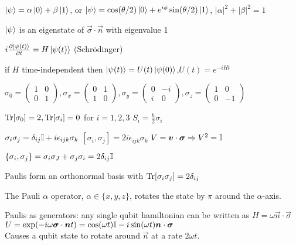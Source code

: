
\begin{squishlist}
    \item $\ket{\psi} = \alpha \ket{0} + \beta \ket{1}$, or $\ket{\psi} = \cos(\theta/2)\ket{0} + e^{i\phi} \sin(\theta/2)\ket{1}$, $|\alpha|^2 + |\beta|^2 = 1$
    \item $\ket{\psi}$ is an eigenstate of $\vec{\sigma}\cdot \vec{n}$ with eigenvalue 1
\end{squishlist}

\begin{squishlist}
    \item $i \D{t}{\ket{\psi(t)}} = H \ket{\psi(t)}$ (Schrödinger)
    \item if $H$ time-independent then $\ket{\psi(t)} = U(t) \ket{\psi(0)}$,\quad $U(t) = e^{-iHt}$
\end{squishlist}

\begin{squishlist}
    \item $\sigma_0 = \begin{pmatrix} 1 & 0\\ 0 & 1 \end{pmatrix},
        \sigma_x = \begin{pmatrix} 0 & 1 \\ 1 & 0 \end{pmatrix}, 
        \sigma_y=\begin{pmatrix} 0 & -i\\ i & 0\end{pmatrix} , 
        \sigma_z = \begin{pmatrix} 1 & 0 \\ 0 & -1\end{pmatrix}$

    \item $\Tr[\sigma_0] = 2, \Tr[\sigma_i] = 0$ for $i=1,2,3$ \hfill $S_i = \frac{\hbar}{2} \sigma_i$
    \item $\sigma_i \sigma_j = \delta_{ij} \id + i \epsilon_{ijk} \sigma_k$ \quad $[\sigma_i, \sigma_j] = 2i \epsilon_{ijk} \sigma_k$ \squishsep $V = \vec{v}\cdot \vec{\sigma} \Rightarrow V^2 = \id$
    \item $\{\sigma_i, \sigma_j \} = \sigma_i \sigma_J + \sigma_j\sigma_i = 2 \delta_{ij} \id$
    \item Paulis form an orthonormal basis with $\Tr[\sigma_i \sigma_j] = 2\delta_{ij}$
    \item The Pauli $\alpha$ operator, $\alpha \in \{x,y,z\}$, rotates the state by $\pi$ around the $\alpha$-axis.

    \item Paulis as generators: any single qubit hamiltonian can be written as $H = \omega \vec{n}\cdot \vec{\sigma}$ \\
        $U = \exp(-i\omega \vec{\sigma}\cdot \vec{n} t) = \cos(\omega t) \id - i \sin(\omega t) \vec{n}\cdot\vec{\sigma}$ \\
        Causes a qubit state to rotate around $\vec{n}$ at a rate $2\omega t$.
\end{squishlist}

